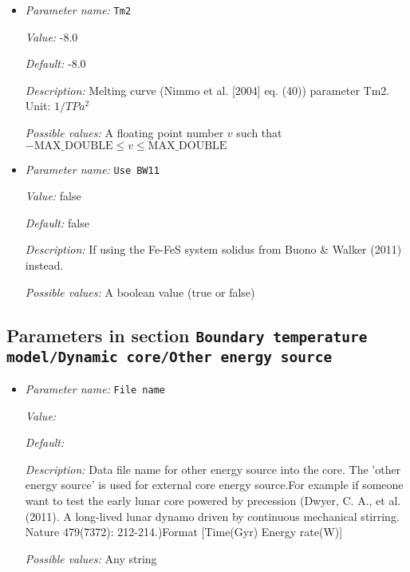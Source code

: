 \begin{itemize}
{\it Possible values:} A floating point number $v$ such that $-\text{MAX\_DOUBLE} \leq v \leq \text{MAX\_DOUBLE}$
\item {\it Parameter name:} {\tt Tm2}
\label{parameters:Boundary temperature model/Dynamic core/Geotherm parameters/Tm2}


{\it Value:} -8.0


{\it Default:} -8.0


{\it Description:} Melting curve (Nimmo et al. [2004] eq. (40)) parameter Tm2. Unit: $1/TPa^2$


{\it Possible values:} A floating point number $v$ such that $-\text{MAX\_DOUBLE} \leq v \leq \text{MAX\_DOUBLE}$
\item {\it Parameter name:} {\tt Use BW11}
\label{parameters:Boundary temperature model/Dynamic core/Geotherm parameters/Use BW11}


{\it Value:} false


{\it Default:} false


{\it Description:} If using the Fe-FeS system solidus from Buono \& Walker (2011) instead.


{\it Possible values:} A boolean value (true or false)
\end{itemize}

\subsection{Parameters in section \tt Boundary temperature model/Dynamic core/Other energy source}
\label{parameters:Boundary_20temperature_20model/Dynamic_20core/Other_20energy_20source}

\begin{itemize}
\item {\it Parameter name:} {\tt File name}
\label{parameters:Boundary temperature model/Dynamic core/Other energy source/File name}


{\it Value:} 


{\it Default:} 


{\it Description:} Data file name for other energy source into the core. The 'other energy source' is used for external core energy source.For example if someone want to test the early lunar core powered by precession (Dwyer, C. A., et al. (2011). A long-lived lunar dynamo driven by continuous mechanical stirring. Nature 479(7372): 212-214.)Format [Time(Gyr)   Energy rate(W)]


{\it Possible values:} Any string
\end{itemize}

